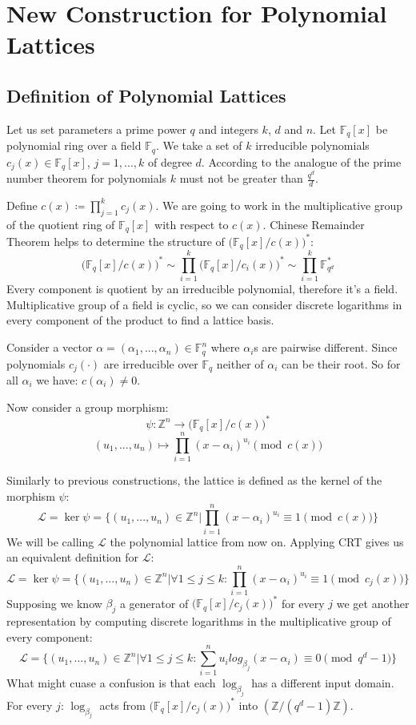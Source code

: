 \documentclass[12pt]{article}
\newcommand{\FF}{\mathbb{F}}
\newcommand{\ZZ}{\mathbb{Z}}
\newcommand{\LL}{\mathcal{L}}
\begin{document}
\section{New Construction for Polynomial Lattices}
\label{sec:polynomials}



\subsection{Definition of Polynomial Lattices}
\label{subsec:def_polynomials}


Let us set parameters a prime power $q$ and integers $k$, $d$ and $n$. Let $\FF_{q}[x]$ be polynomial ring over a field  $\FF_{q}$. We take a set of $k$ irreducible polynomials $c_{j}(x) \in \FF_{q}[x]$, $j =1, ...,k$ of degree $d$. According to the analogue of the prime number theorem for polynomials $k$ must not be greater than $\frac{q^d}{d}$.

Define $c(x) \coloneqq \prod_{j = 1}^{k} c_{j}(x)$. We are going to work in the multiplicative group of the quotient ring of  $\FF_{q}[x]$ with respect to $c(x)$.
Chinese Remainder Theorem helps to determine the structure of $\big(\FF_{q}[x]/c(x)\big)^{*}$:
\[
    \big(\FF_{q}[x]/c(x)\big)^{*} \sim \prod_{i=1}^{k}\big(\FF_{q}[x]/c_{i}(x)\big)^{*} \sim \prod_{i=1}^{k}\FF_{q^{d}}^*
\]
Every component is quotient by an irreducible polynomial, therefore it's a field. Multiplicative group of a field is cyclic, so we can consider discrete logarithms in every component of the product to find a lattice basis.

Consider a vector $\alpha = (\alpha_{1}, ... , \alpha_{n}) \in \FF_{q}^{n}$ where $\alpha_{i}$s are pairwise different. Since polynomials $c_{j}(\cdot)$ are irreducible over $\FF_{q}$ neither of $\alpha_{i}$ can be their root. So for all $\alpha_{i}$ we have: $c(\alpha_{i}) \neq 0$.

Now consider a group morphism:
\[
    \psi : \ZZ^{n} \rightarrow \big(\FF_{q}[x]/c(x)\big)^{*}
\]
\[
    (u_{1}, ..., u_{n}) \mapsto \prod_{i=1}^{n}(x - \alpha_{i})^{u_{i}} \pmod{c(x)}
\]

Similarly to previous constructions, the lattice is defined as the kernel of the morphism $\psi$:
\[
    \LL = \ker \psi = \{(u_{1}, ..., u_{n}) \in \ZZ^{n} | \prod_{i=1}^{n}(x - \alpha_{i})^{u_{i}} \equiv 1 \pmod{c(x)}\}
\]
We will be calling $\LL$ the polynomial lattice from now on. Applying CRT gives us an equivalent definition for $\LL$:
\[
    \LL = \ker \psi = \{(u_{1}, ..., u_{n}) \in \ZZ^{n} |  \forall 1 \leq j \leq k: \prod_{i=1}^{n}(x - \alpha_{i})^{u_{i}} \equiv 1 \pmod{c_{j}(x)}\}
\]
Supposing we know $\beta_{j}$ a generator of $\big(\FF_{q}[x]/c_{j}(x)\big)^{*}$ for every $j$ we get another representation by computing discrete logarithms in the multiplicative group of every component:
\[
    \LL = \{(u_{1}, ..., u_{n}) \in \ZZ^{n} | \forall 1 \leq j \leq k: \sum_{i=1}^{n}u_{i}log_{\beta_{j}}(x - \alpha_{i}) \equiv 0 \pmod{q^{d} -1}\}
\]
What might cuase a confusion is that each $\log_{\beta_{j}}$ has a different input domain. For every $j$:  $\log_{\beta_{j}}$ acts from $\big(\FF_{q}[x]/c_{j}(x)\big)^{*}$ into $(\ZZ/(q^{d} - 1)\ZZ)$.
\end{document}
